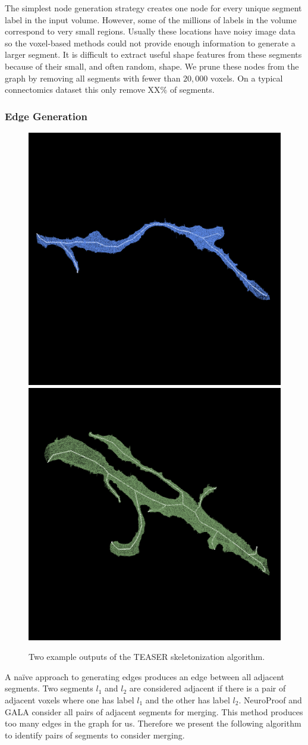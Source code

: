 The simplest node generation strategy creates one node for every unique segment label in the input volume.
However, some of the millions of labels in the volume correspond to very small regions. 
Usually these locations have noisy image data so the voxel-based methods could not provide enough information to generate a larger segment.
It is difficult to extract useful shape features from these segments because of their small, and often random, shape. 
We prune these nodes from the graph by removing all segments with fewer than $20,000$ voxels. 
On a typical connectomics dataset this only remove XX$\%$ of segments. 

\subsubsection{Edge Generation}

\begin{figure}[t!]
	\centering
	\includegraphics[width=0.42\linewidth]{./figures/skeleton1.png}
	\hspace{0.085\linewidth}
	\includegraphics[width=0.42\linewidth]{./figures/skeleton2.png}
	\caption{Two example outputs of the TEASER skeletonization algorithm.}
	\label{fig:skeletonization}
\end{figure}

A na\"ive approach to generating edges produces an edge between all adjacent segments.
Two segments $l_1$ and $l_2$ are considered adjacent if there is a pair of adjacent voxels where one has label $l_1$ and the other has label $l_2$. 
NeuroProof and GALA consider all pairs of adjacent segments for merging. 
This method produces too many edges in the graph for us.
Therefore we present the following algorithm to identify pairs of segments to consider merging. 

